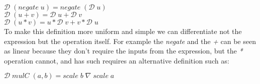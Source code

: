 \documentclass[11pt,a4]{article}
\newcommand{\Varid}[1]{\mathit{#1}}
\theoremstyle{definition}
\theoremstyle{Definition}
\theoremstyle{Definition}
\begin{document}
    \ensuremath{\mathcal{D}\;(\Varid{negate}\;\Varid{u})\mathrel{=}\Varid{negate}\;(\mathcal{D}\;\Varid{u})}\\
    \ensuremath{\mathcal{D}\;(\Varid{u}\mathbin{+}\Varid{v})\mathrel{=}\mathcal{D}\;\Varid{u}\mathbin{+}\mathcal{D}\;\Varid{v}}\\
    \ensuremath{\mathcal{D}\;(\Varid{u}\mathbin{*}\Varid{v})\mathrel{=}\Varid{u}\mathbin{*}\mathcal{D}\;\Varid{v}\mathbin{+}\Varid{v}\mathbin{*}\mathcal{D}\;\Varid{u}}\\
    
    To make this definition more uniform and simple we can differentiate not the expression but the operation itself. For example the \textit{negate} and the \textit{+} can be seen as linear because they don't require the inputs from the expression, but the \textit{*} operation cannot, and has such requires an alternative definition such as: 

    \ensuremath{\mathcal{D}\;\Varid{mulC}\;(\Varid{a},\Varid{b})\mathrel{=}\Varid{scale}\;\Varid{b}\; \nabla \;\Varid{scale}\;\Varid{a}}
\end{document}
